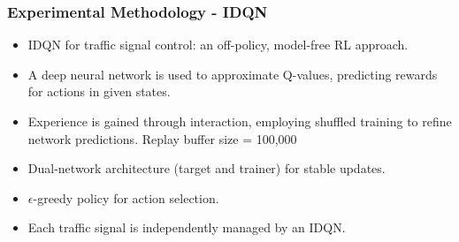 \documentclass[compress,12pt]{beamer}
\begin{document}
\begin{frame}[bg=arguelles.png]
      \frametitle{Experimental Methodology - IDQN}
      \begin{itemize}
        \item IDQN for traffic signal control: an off-policy, model-free RL approach.
        \item A deep neural network is used to approximate Q-values, predicting rewards for actions in given states.
        \item Experience is gained through interaction, employing shuffled training to refine network predictions. Replay buffer size = 100,000
        \item Dual-network architecture (target and trainer) for stable updates.
        \item $\epsilon$-greedy policy for action selection.
        \item Each traffic signal is independently managed by an IDQN.
      \end{itemize}
\end{frame}
\end{document}

